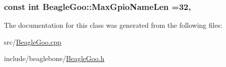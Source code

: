 \hypertarget{struct_beagle_goo_ae4b9d09b2bfaf386c5d6fb9fdee0d4fa}{
\subsubsection[{Max\-Gpio\-Name\-Len}]{\setlength{\rightskip}{0pt plus 5cm}const int Beagle\-Goo\-::\-Max\-Gpio\-Name\-Len =32\hspace{0.3cm}{\ttfamily [static]}, {\ttfamily [protected]}}}\label{struct_beagle_goo_ae4b9d09b2bfaf386c5d6fb9fdee0d4fa}


The documentation for this class was generated from the following files\-:\begin{DoxyCompactItemize}
\item 
src/\hyperlink{_beagle_goo_8cpp}{Beagle\-Goo.\-cpp}\item 
include/beaglebone/\hyperlink{_beagle_goo_8h}{Beagle\-Goo.\-h}\end{DoxyCompactItemize}
